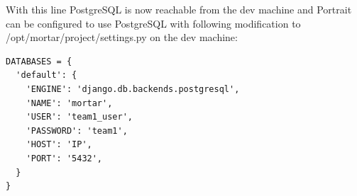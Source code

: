 With this line PostgreSQL is now reachable from the dev machine and
Portrait can be configured to use PostgreSQL with following
modification to /opt/mortar/project/settings.py on the dev machine:\\
\begin{lstlisting}[escapechar=&]
DATABASES = {
  'default': {
    'ENGINE': 'django.db.backends.postgresql',
    'NAME': 'mortar',
    'USER': 'team1_user',
    'PASSWORD': 'team1',
    'HOST': 'IP',
    'PORT': '5432',
  }
}
\end{lstlisting}


